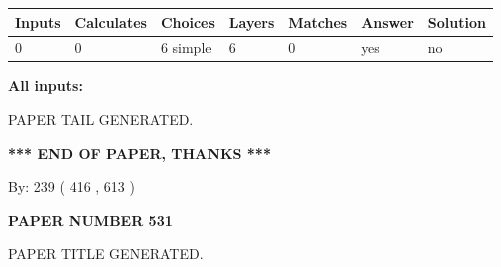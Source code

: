 \documentclass[12pt]{article}
\begin{document}
   
   
   
\noindent\begin{tabular}{|l|l|l|l|l|l|l|}
 \hline
Inputs & Calculates & Choices & Layers & Matches & Answer & Solution \\ \hline
 0  & 
 0  & 
 6
  simple  
  & 
 6  & 
 0  & 
  yes & 
  no 
  \\ \hline
 \end{tabular}
   
   
   
   
\noindent{}
   
   
   
   
\noindent\vspace{0.1in}\hspace{-0.08in} {\textbf{\Large{All inputs: }}}
   
   
   
   
   
   
 \vspace{0.2in}
 
   
   
\vspace{2.0in} PAPER TAIL GENERATED.
   
   
   
   
\vspace{1.0in} 
{\textbf{\large{ *** END OF PAPER, THANKS *** }}} 
   
   
\hspace{1.0in} By: 
 239 ( 416 ,  613 )
   
   
   
   
\newpage 
\setcounter{page}{ 
   531001 } 
   
   
   
   
 {\textbf{ \Large{ PAPER NUMBER  531  }}}
   
   
\vspace{0.2in}
   
   
   
   
   
   
   
   
 \vspace{0.2in}
 
 
 
 
   
   
 PAPER TITLE GENERATED.
   
   
   
\end{document}
